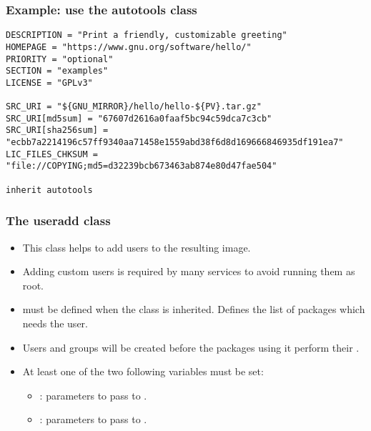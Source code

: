 \begin{frame}[fragile]
  \frametitle{Example: use the autotools class}
  \begin{block}{}
    \begin{verbatim}
DESCRIPTION = "Print a friendly, customizable greeting"
HOMEPAGE = "https://www.gnu.org/software/hello/"
PRIORITY = "optional"
SECTION = "examples"
LICENSE = "GPLv3"

SRC_URI = "${GNU_MIRROR}/hello/hello-${PV}.tar.gz"
SRC_URI[md5sum] = "67607d2616a0faaf5bc94c59dca7c3cb"
SRC_URI[sha256sum] = "ecbb7a2214196c57ff9340aa71458e1559abd38f6d8d169666846935df191ea7"
LIC_FILES_CHKSUM = "file://COPYING;md5=d32239bcb673463ab874e80d47fae504"

inherit autotools
    \end{verbatim}
  \end{block}
\end{frame}

\begin{frame}
  \frametitle{The useradd class}
  \begin{itemize}
    \item This class helps to add users to the resulting image.
    \item Adding custom users is required by many services to avoid
          running them as root.
    \item {} must be defined when the
           class is inherited. Defines the list of
          packages which needs the user.
    \item Users and groups will be created before the packages using
          it perform their .
    \item At least one of the two following variables must be set:
    \begin{itemize}
      \item {}: parameters to pass to
            .
      \item {}: parameters to pass to
            .
    \end{itemize}
  \end{itemize}
\end{frame}

